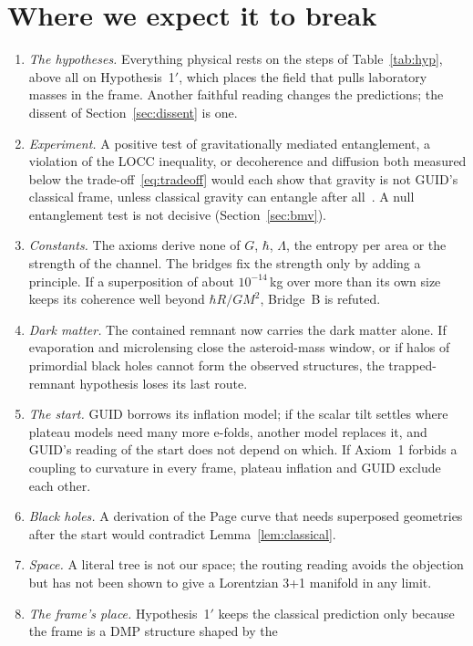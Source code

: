 \section{Where we expect it to break}\label{sec:break}
\begin{enumerate}[nosep]
\item \emph{The hypotheses.} Everything physical rests on the steps of Table~\ref{tab:hyp}, above all on Hypothesis~1$'$, which places the
field that pulls laboratory masses in the frame. Another faithful reading changes the predictions; the dissent of
Section~\ref{sec:dissent} is one.
\item \emph{Experiment.} A positive test of gravitationally mediated entanglement, a violation of the LOCC inequality, or decoherence and
diffusion both measured below the trade-off~\eqref{eq:tradeoff} would each show that gravity is not GUID's classical frame, unless
classical gravity can entangle after all~\cite{azizhowl}. A null entanglement test is not decisive (Section~\ref{sec:bmv}).
\item \emph{Constants.} The axioms derive none of $G$, $\hbar$, $\Lambda$, the entropy per area or the strength of the channel. The bridges
fix the strength only by adding a principle. If a superposition of about $10^{-14}$\,kg over more than its own size keeps its coherence well
beyond $\hbar R/GM^2$, Bridge~B is refuted.
\item \emph{Dark matter.} The contained remnant now carries the dark matter alone. If evaporation and microlensing close the asteroid-mass
window, or if halos of primordial black holes cannot form the observed structures, the trapped-remnant hypothesis loses its last route.
\item \emph{The start.} GUID borrows its inflation model; if the scalar tilt settles where plateau models need many more e-folds, another
model replaces it, and GUID's reading of the start does not depend on which. If Axiom~1 forbids a coupling to curvature in every frame,
plateau inflation and GUID exclude each other.
\item \emph{Black holes.} A derivation of the Page curve that needs superposed geometries after the start would contradict
Lemma~\ref{lem:classical}.
\item \emph{Space.} A literal tree is not our space; the routing reading avoids the objection but has not been shown to give a Lorentzian
3+1 manifold in any limit.
\item \emph{The frame's place.} Hypothesis~1$'$ keeps the classical prediction only because the frame is a DMP structure shaped by the

\end{enumerate}
